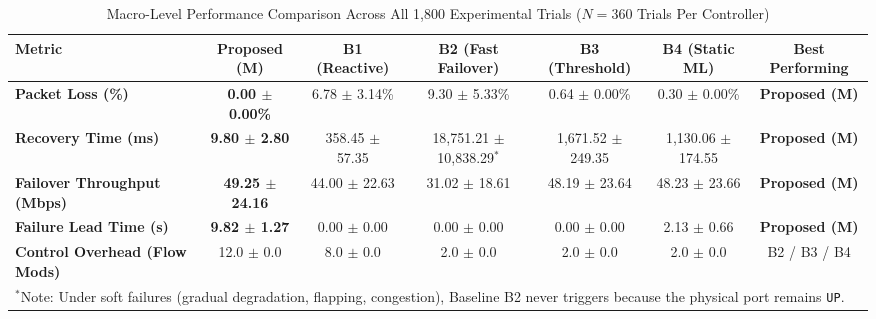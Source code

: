 \documentclass[10pt,twocolumn]{article}
\begin{document}
\begin{table}[!t]
\centering
\caption{Macro-Level Performance Comparison Across All 1,800 Experimental Trials ($N = 360$ Trials Per Controller)}
\label{tab:macro_results}
\begin{tabular}{lcccccc}
\toprule
\textbf{Metric} & \textbf{Proposed (M)} & \textbf{B1 (Reactive)} & \textbf{B2 (Fast Failover)} & \textbf{B3 (Threshold)} & \textbf{B4 (Static ML)} & \textbf{Best Performing} \\
\midrule
\textbf{Packet Loss (\%)} & \textbf{0.00 $\pm$ 0.00\%} & 6.78 $\pm$ 3.14\% & 9.30 $\pm$ 5.33\% & 0.64 $\pm$ 0.00\% & 0.30 $\pm$ 0.00\% & \textbf{Proposed (M)} \\
\textbf{Recovery Time (ms)} & \textbf{9.80 $\pm$ 2.80} & 358.45 $\pm$ 57.35 & 18,751.21 $\pm$ 10,838.29$^*$ & 1,671.52 $\pm$ 249.35 & 1,130.06 $\pm$ 174.55 & \textbf{Proposed (M)} \\
\textbf{Failover Throughput (Mbps)} & \textbf{49.25 $\pm$ 24.16} & 44.00 $\pm$ 22.63 & 31.02 $\pm$ 18.61 & 48.19 $\pm$ 23.64 & 48.23 $\pm$ 23.66 & \textbf{Proposed (M)} \\
\textbf{Failure Lead Time (s)} & \textbf{9.82 $\pm$ 1.27} & 0.00 $\pm$ 0.00 & 0.00 $\pm$ 0.00 & 0.00 $\pm$ 0.00 & 2.13 $\pm$ 0.66 & \textbf{Proposed (M)} \\
\textbf{Control Overhead (Flow Mods)} & 12.0 $\pm$ 0.0 & 8.0 $\pm$ 0.0 & 2.0 $\pm$ 0.0 & 2.0 $\pm$ 0.0 & 2.0 $\pm$ 0.0 & B2 / B3 / B4 \\
\bottomrule
\multicolumn{7}{l}{$^*$Note: Under soft failures (gradual degradation, flapping, congestion), Baseline B2 never triggers because the physical port remains \texttt{UP}.}
\end{tabular}
\end{table}
\end{document}
